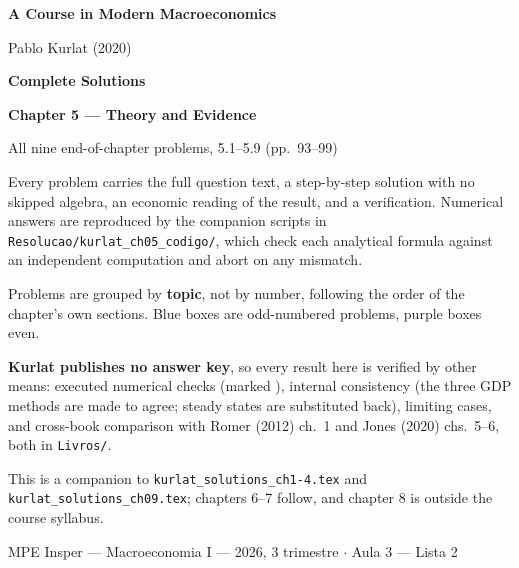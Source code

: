 \documentclass[12pt, letterpaper]{article}
\begin{document}
\begin{titlepage}
\centering
\vspace*{2.5cm}
{\Huge\bfseries\color{darkblue} A Course in Modern Macroeconomics\par}
\vspace{6pt}
{\large Pablo Kurlat (2020)\par}
\vspace{1.4cm}
{\LARGE\bfseries Complete Solutions\par}
\vspace{6pt}
{\LARGE\bfseries Chapter 5 --- Theory and Evidence\par}
\vspace{1.2cm}
{\large All nine end-of-chapter problems, 5.1--5.9 (pp.~93--99)\par}
\vspace{2cm}

\begin{tcolorbox}[theorybox,title={What is in this file},width=0.86\textwidth]
\small
Every problem carries the full question text, a step-by-step solution with no skipped
algebra, an economic reading of the result, and a verification. Numerical answers are
reproduced by the companion scripts in \texttt{Resolucao/kurlat\_ch05\_codigo/}, which
check each analytical formula against an independent computation and abort on any
mismatch.

\smallskip
Problems are grouped by \textbf{topic}, not by number, following the order of the
chapter's own sections. Blue boxes are odd-numbered problems, purple boxes even.

\smallskip
\textbf{Kurlat publishes no answer key}, so every result here is verified by other means:
executed numerical checks (marked \checkmark), internal consistency (the three GDP methods
are made to agree; steady states are substituted back), limiting cases, and cross-book
comparison with Romer (2012) ch.~1 and Jones (2020) chs.~5--6, both in \texttt{Livros/}.

\smallskip
This is a companion to \texttt{kurlat\_solutions\_ch1-4.tex} and
\texttt{kurlat\_solutions\_ch09.tex}; chapters 6--7 follow, and chapter 8 is outside the
course syllabus.
\end{tcolorbox}

\vfill
{\small MPE Insper --- Macroeconomia I --- 2026, 3\textordmasculine{} trimestre \quad$\cdot$\quad
Aula 3 --- Lista 2\par}
\end{titlepage}
\end{document}
